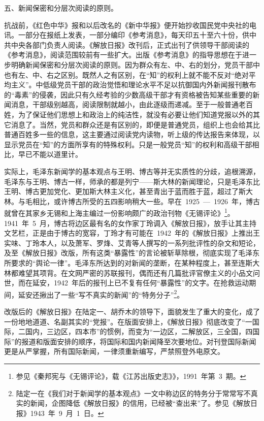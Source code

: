 五、新闻保密和分层次阅读的原则。

抗战前，《红色中华》报和以后改名的《新中华报》便开始抄收国民党中央社的电讯。一部分在报纸上发表，一部分编印《参考消息》，每天印五十至六十份，供中共中央各部门负责人阅读。《解放日报》改刊后，正式出刊了供领导干部阅读的《参考消息》，阅读范围较前有一些扩大。出版《参考消息》的指导思想在于进一步明确新闻保密和分层次阅读的原则。因为群众有左、中、右的划分，党员干部中也有左、中、右之区别。既然人之有区别，在“知”的权利上就不能不反对“绝对平均主义”。中低级党员干部的政治觉悟和理论水平不足以抗御国内外新闻报刊散布的“毒素”的侵袭，因此只有久经考验的少数高级干部才有资格被告知某些重要的新闻消息，干部级别越高，阅读限制就越小，由此逐级而递减。至于一般普通老百姓，为了保证他们思想上和政治上的纯洁性，就没有必要让他们知道党报以外的其它消息了。当然，党员和群众还是有区别的，即便是普通党员，组织上也会给其比普通百姓多一些的信息，这主要通过阅读党内读物，听上级的传达报告来体现，以显示党员在“知”的方面所享有的特殊权利。只是一般党员“知”的权利和高级干部相比，早已不能以道里计。

实际上，毛泽东新闻学的基本观点与王明、博古等并无实质性的分歧，追根溯源，毛泽东与王明、博古一样，师承的都是列宁——斯大林的新闻理论，只是毛泽东比王明、博古更加党化、更加斯大林主义化，甚至青出于蓝而胜于蓝，超过了斯大林。与毛相比，或许博古所受的五四影响稍大一些。早在~1925~—~1926~年，博古就曾在其家乡无锡和上海主编过一份影响颇广的政治刊物《无锡评论》\footnote{参见《秦邦宪与《无锡评论》，载《江苏出版史志》》，1991~年第~3~期。}。1941~年~5~月，博古将边区最有名的女作家丁玲调入《解放日报》，放手让其主持文艺栏，正是由于博古的宽容，丁玲才有可能在~1942~年的《解放日报》上推出王实味、丁玲本人，以及萧军、罗烽、艾青等人撰写的一系列批评性的杂文和短论，及至《解放日报》改版，所有这类“暴露性”的言论被斩草除根，彻底实现了毛泽东所要求的“舆论一律”。毛泽东所达到的对新闻的垄断，在某种程度上，甚至连斯大林都难望其项背。在文网严密的苏联报刊，偶而还有几篇批评官僚主义的小品文问世，而在延安，1942~年后的报刊上已不复有任何“暴露性”的文字。在抢救运动期间，延安还揪出了一些“写不真实的新闻”的“特务分子”\footnote{陆定一在《我们对于新闻学的基本观点》一文中称边区的特务分于常常写不真实的新闻，企图降低《解放日报》的信用，已经被“查出来”了。参见《解放日报》1943~年~9~月~1~日。}。

改版后的《解放日报》在陆定一、胡乔木的领导下，面貌发生了重大的变化，成了一份地地道道、名副其实的“党报”。在版面安排上，《解放日报》彻底改变了“一国际，二国内，三边区，四本市”的惯例，而变为“一边区，二解放区，三全国，四国际”的报道和版面安排的顺序，将国际和国内新闻降至次要地位。对刊登国际新闻更是从严掌握，所有国际新闻，一律须重新编写，严禁照登外电原文。

